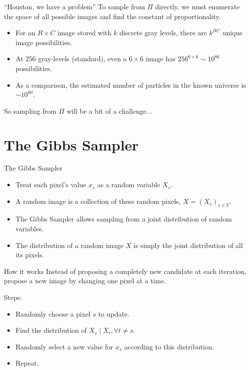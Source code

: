 \documentclass[10pt]{beamer}
\begin{document}
\begin{frame}{``Houston, we have a problem''}
To sample from $\Pi$ directly, we must enumerate the space of all possible images and find the constant of proportionality.
\begin{itemize}
\pause \item For an $R \times C$ image stored with $k$ discrete gray levels, there are $k^{RC}$ unique image possibilities.
\pause \item At $256$ gray-levels (standard), even a $6\times 6$ image has $256^{6\times 6} \sim 10^{86}$ possibilities.
\pause \item As a comparison, the estimated number of particles in the known universe is $\sim 10^{80}$.
\end{itemize}
\pause 
So sampling from $\Pi$ will be a bit of a challenge...
\end{frame}

\section{The Gibbs Sampler}

\begin{frame}{The Gibbs Sampler}
\begin{itemize}
\item Treat each pixel's value $x_s$ as a random variable $X_s$.
\item A random image is a collection of these random pixels, $X = (X_s)_{s \in V}$.
\item The Gibbs Sampler allows sampling from a joint distribution of random variables. 
\item The distribution of a random image $X$ is simply the joint distribution of all its pixels.
\end{itemize}
\end{frame}

\begin{frame}{How it works}
Instead of proposing a completely new candidate at each iteration, propose a new image by changing one pixel at a time.

Steps:
\begin{itemize}
\item Randomly choose a pixel $s$ to update.
\item Find the distribution of $X_s \mid X_t, \forall t \neq s$.
\item Randomly select a new value for $x_s$ according to this distribution.
\item Repeat.
\end{itemize}
\end{frame}
\end{document}
